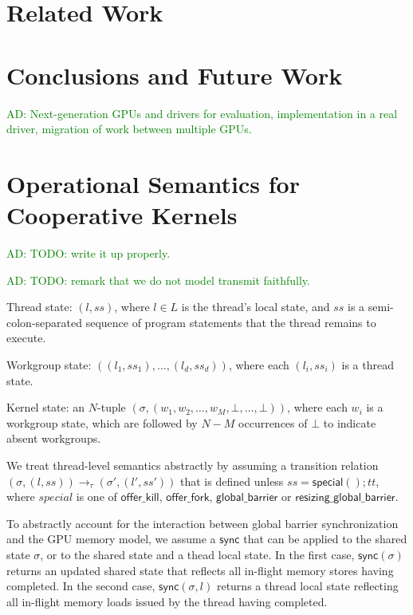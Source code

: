 \documentclass[nocopyrightspace]{sigplanconf-pldi16}
\newcommand{\ADComment}[1]{\textcolor{green}{AD: #1}}
\newcommand{\offerfork}{\mathsf{offer\_fork}}
\newcommand{\offerkill}{\mathsf{offer\_kill}}
\newcommand{\globalbarrier}{\mathsf{global\_barrier}}
\newcommand{\resizingglobalbarrier}{\mathsf{resizing\_global\_barrier}}
\begin{document}
\section{Related Work}\label{sec:relatedwork}

\section{Conclusions and Future Work}\label{sec:conclusion}

\ADComment{Next-generation GPUs and drivers for evaluation,
  implementation in a real driver, migration of work between multiple
  GPUs.}

\appendix

\section{Operational Semantics for Cooperative Kernels}\label{appendix:semantics}

\ADComment{TODO: write it up properly.}

\ADComment{TODO: remark that we do not model transmit faithfully.}

Thread state: $(l, \mathit{ss})$, where $l \in L$ is the thread's
local state, and $\mathit{ss}$ is a semi-colon-separated sequence of
program statements that the thread remains to execute.

Workgroup state: $((l_1, \mathit{ss}_1), \dots, (l_d,
\mathit{ss}_d))$, where each $(l_i, \mathit{ss}_i)$ is a thread state.

Kernel state: an $N$-tuple $(\sigma, (w_1, w_2, \dots, w_M, \bot,
\dots, \bot))$, where each $w_i$ is a workgroup state, which are
followed by $N-M$ occurrences of $\bot$ to indicate absent workgroups.

We treat thread-level semantics abstractly by assuming a transition
relation $(\sigma, (l, \mathit{ss})) \rightarrow_{\tau} (\sigma', (l',
\mathit{ss}'))$ that is defined unless $\mathit{ss} =
\mathsf{special}(); \mathit{tt}$, where $\mathit{special}$ is one of
$\offerkill$, $\offerfork$, $\globalbarrier$ or
$\resizingglobalbarrier$.

To abstractly account for the interaction between global barrier
synchronization and the GPU memory model, we assume a $\mathsf{sync}$
that can be applied to the shared state $\sigma$, or to the shared
state and a thead local state.  In the first case,
$\mathsf{sync}(\sigma)$ returns an updated shared state that reflects
all in-flight memory stores having completed.  In the second case,
$\mathsf{sync}(\sigma, l)$ returns a thread local state reflecting all
in-flight memory loads issued by the thread having completed.
\end{document}

